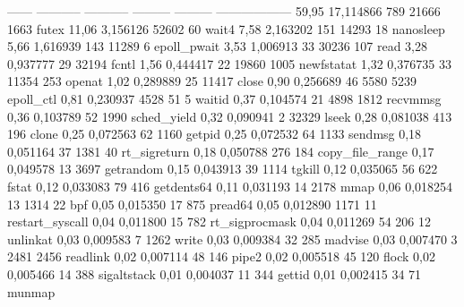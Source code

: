 \begin{myverbatim}
------ ----------- ----------- --------- --------- ------------------
 59,95   17,114866         789     21666      1663 futex
 11,06    3,156126       52602        60           wait4
  7,58    2,163202         151     14293        18 nanosleep
  5,66    1,616939         143     11289         6 epoll_pwait
  3,53    1,006913          33     30236       107 read
  3,28    0,937777          29     32194           fcntl
  1,56    0,444417          22     19860      1005 newfstatat
  1,32    0,376735          33     11354       253 openat
  1,02    0,289889          25     11417           close
  0,90    0,256689          46      5580      5239 epoll_ctl
  0,81    0,230937        4528        51         5 waitid
  0,37    0,104574          21      4898      1812 recvmmsg
  0,36    0,103789          52      1990           sched_yield
  0,32    0,090941           2     32329           lseek
  0,28    0,081038         413       196           clone
  0,25    0,072563          62      1160           getpid
  0,25    0,072532          64      1133           sendmsg
  0,18    0,051164          37      1381        40 rt_sigreturn
  0,18    0,050788         276       184           copy_file_range
  0,17    0,049578          13      3697           getrandom
  0,15    0,043913          39      1114           tgkill
  0,12    0,035065          56       622           fstat
  0,12    0,033083          79       416           getdents64
  0,11    0,031193          14      2178           mmap
  0,06    0,018254          13      1314        22 bpf
  0,05    0,015350          17       875           pread64
  0,05    0,012890        1171        11           restart_syscall
  0,04    0,011800          15       782           rt_sigprocmask
  0,04    0,011269          54       206        12 unlinkat
  0,03    0,009583           7      1262           write
  0,03    0,009384          32       285           madvise
  0,03    0,007470           3      2481      2456 readlink
  0,02    0,007114          48       146           pipe2
  0,02    0,005518          45       120           flock
  0,02    0,005466          14       388           sigaltstack
  0,01    0,004037          11       344           gettid
  0,01    0,002415          34        71           munmap
\end{myverbatim}
\newpage
